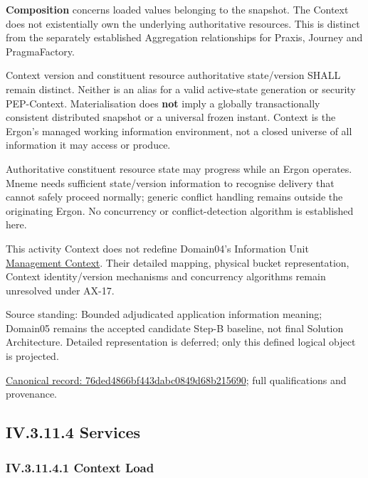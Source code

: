 \textbf{Composition} concerns loaded values belonging to the snapshot. The Context
does not existentially own the underlying authoritative resources. This is
distinct from the separately established Aggregation relationships for Praxis,
Journey and PragmaFactory.



Context version and constituent resource authoritative state/version SHALL
remain distinct. Neither is an alias for a valid active-state generation or
security PEP-Context. Materialisation does \textbf{not} imply a globally
transactionally consistent distributed snapshot or a universal frozen instant.
Context is the Ergon's managed working information environment, not a closed
universe of all information it may access or produce.



Authoritative constituent resource state may progress while an Ergon operates.
Mneme needs sufficient state/version information to recognise delivery that cannot
safely proceed normally; generic conflict handling remains outside the originating
Ergon. No concurrency or conflict-detection algorithm is established here.



This activity Context does not redefine Domain04's Information Unit
\href{\detokenize{../../../../../docs/markdown/04-information-architecture/metamodel/information-architecture-metamodel.md#65-context}}{Management Context}.
Their detailed mapping, physical bucket representation, Context identity/version
mechanisms and concurrency algorithms remain unresolved under AX-17.



Source standing: Bounded adjudicated application information meaning; Domain05 remains the accepted candidate Step-B baseline, not final Solution Architecture. Detailed representation is deferred; only this defined logical object is projected.


{\footnotesize \href{../../../../continuum/application/data-object/76ded4866bf443dabc0849d68b215690.md}{Canonical record: 76ded4866bf443dabc0849d68b215690}; full qualifications and provenance.}\par
\subsection*{IV.3.11.4 Services}
\label{navigation:IV.3.11.4}

\subsubsection*{IV.3.11.4.1 Context Load}
\label{navigation:IV.3.11.4.1}

